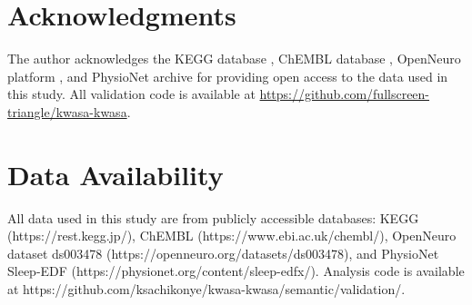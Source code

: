 \documentclass[twocolumn,10pt]{article}
\begin{document}
\section*{Acknowledgments}

The author acknowledges the KEGG database \citep{kanehisa2000kegg}, ChEMBL database \citep{gaulton2012chembl}, OpenNeuro platform \citep{markiewicz2021openneuro}, and PhysioNet archive \citep{goldberger2000physiobank} for providing open access to the data used in this study.  All validation code is available at \url{https://github.com/fullscreen-triangle/kwasa-kwasa}.

\section*{Data Availability}

All data used in this study are from publicly accessible databases: KEGG (https://rest.kegg.jp/), ChEMBL (https://www.ebi.ac.uk/chembl/), OpenNeuro dataset ds003478 (https://openneuro.org/datasets/ds003478), and PhysioNet Sleep-EDF (https://physionet.org/content/sleep-edfx/).  Analysis code is available at https://github.com/ksachikonye/kwasa-kwasa/semantic/validation/.



\end{document}
